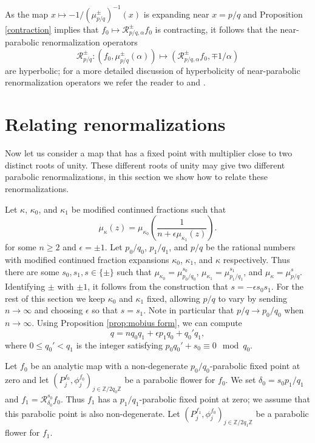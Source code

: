 \documentclass[12pt,letterpaper]{amsart}
\numberwithin{equation}{section}
\theoremstyle{remark}
\theoremstyle{definition}
\newcommand{\Z}{\mathbb Z}
\newcommand{\RR}{\mathcal R}
\begin{document}
	As the map $x\mapsto - 1/(\mu_{p/q}^\pm)^{-1}(x)$ is expanding near $x = p/q$ and Proposition \ref{contraction} implies that $f_0\mapsto \RR_{p/q, \alpha}^\pm f_0$ is contracting, it follows that 
	the near-parabolic renormalization operators	
	$$
		\RR_{p/q}^\pm: (f_0, \mu_{p/q}^\pm(\alpha))\mapsto (\RR_{p/q, \alpha}^\pm f_0, \mp1/\alpha)
	$$
	are hyperbolic; for a more detailed discussion of hyperbolicity of near-parabolic renormalization operators  we refer the reader to \cite{shishikura} and \cite{CS_satellite}.
	
	\section{Relating renormalizations}\label{sec:repeated}
	
	Now let us consider a map that has a fixed point with multiplier close to two distinct roots of unity. 
	These different roots of unity may give two different parabolic renormalizations,  in this section we show how to relate these renormalizations.  
	
	
	Let $\kappa$, $\kappa_0$, and $\kappa_1$ be modified continued fractions such that 
	\begin{equation*}%
		\mu_\kappa(z) = \mu_{\kappa_0}\left(\frac{1}{n+ \epsilon\mu_{\kappa_1}(z)}\right).
	\end{equation*}
	for some $n\geq 2$ and $\epsilon = \pm 1$.
	Let $p_0/q_0$, $p_1/q_1$, and $p/q$ be the rational numbers with modified continued fraction expansions $\kappa_0$, $\kappa_1$, and $\kappa$ respectively. 
	Thus there are some $s_0, s_1, s\in \{\pm\}$ such that $\mu_{\kappa_0}= \mu_{p_0/q_0}^{s_0}$,
	$\mu_{\kappa_1}= \mu_{p_1/q_1}^{s_1}$, 
	and $\mu_{\kappa}= \mu_{p/q}^{s}$.
	Identifying  $\pm$ with $\pm 1$, it follows from the construction that $s = -\epsilon s_0s_1$. 
	For the rest of this section we keep $\kappa_0$ and $\kappa_1$ fixed, allowing $p/q$ to vary by sending $n\to \infty$ and choosing $\epsilon$ so that $s = s_1$.
	Note in particular that $p/q\to p_0/q_0$ when $n\to \infty$.
	Using Proposition \ref{prop:mobius form}, we can compute 
	\begin{equation}\label{eq: q}
		q = nq_0q_1+\epsilon p_1q_0+ q_0'q_1,
	\end{equation}
	where $0\leq q_0'< q_1$ is the integer satisfying $p_0q_0' + s_0 \equiv 0 \mod q_0$.
	
	
	
	Let $f_0$ be an analytic map with a non-degenerate $p_0/q_0$-parabolic fixed point at zero and let $(P_j^{f_0}, \phi_j^{f_0})_{j\in \Z/2q_0\Z}$ be a parabolic flower for $f_0$.
	We set $\delta_0 = s_0p_1/q_1$ and $f_1 = \RR^{s_0}_{\delta_0}f_0$.
	Thus $f_1$ has a $p_1/q_1$-parabolic fixed point at zero; we assume that this parabolic point is also non-degenerate.
	 Let $(P_j^{f_1}, \phi_j^{f_0})_{j\in \Z/2q_1\Z}$ be a parabolic flower for $f_1$.
	
\end{document}
